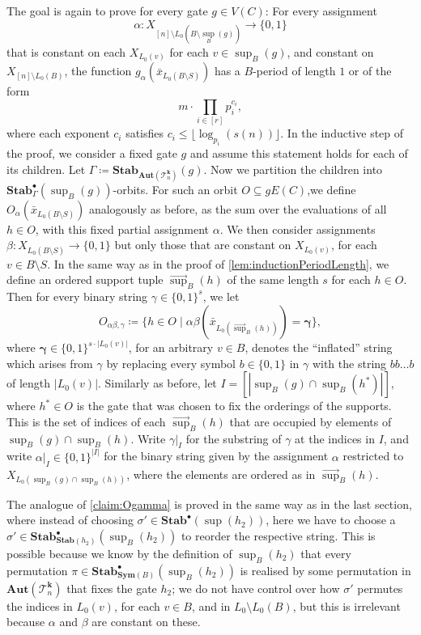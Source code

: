\documentclass[11pt]{article}
\DeclareMathOperator{\supp}{sup}
\newcommand{\Aut}{\mathbf{Aut}}
\newcommand{\Sym}{\mathbf{Sym}}
\newcommand{\Stab}{\mathbf{Stab}}
\newcommand{\StabP}{\mathbf{Stab}^{\bullet}}
\newcommand{\Tt}{{\mathcal T}}
\theoremstyle{definition}
\theoremstyle{plain}
\theoremstyle{remark}
\theoremstyle{remark}
\begin{document}
The goal is again to prove for every gate $g \in V(C)$: For every assignment 
\[
\alpha \colon X_{[n] \setminus L_0(B \setminus \supp_{B}(g))} \to \{0,1\}
\]
that is constant on each $X_{L_0(v)}$ for each $v \in \supp_{B}(g)$, and constant on $X_{[n] \setminus L_0(B)}$, the function $g_\alpha(\bar{x}_{L_0(B \setminus S)})$ has a $B$-period of length  $1$ or of the form 
\[
m \cdot \prod_{i \in [r]} p_i^{c_i},
\]
where each exponent $c_i$ satisfies $c_i \leq \lfloor \log_{p_i}(s(n)) \rfloor$. In the inductive step of the proof, we consider a fixed gate $g$ and assume this statement holds for each of its children. Let $\Gamma \coloneqq  \Stab_{\Aut(\Tt_n^{\boldsymbol{k}})}(g)$.
Now we partition the children into $\StabP_\Gamma(\supp_{B}(g))$-orbits. For such an orbit $O \subseteq gE(C)$,we define $O_\alpha(\bar{x}_{L_0(B \setminus S)})$ analogously as before, as the sum over the evaluations of all $h \in O$, with this fixed partial assignment $\alpha$. 
We then consider assignments $\beta \colon X_{L_0(B \setminus S)} \to \{0,1\}$ but only those that are constant on $X_{L_0(v)}$, for each $v \in B \setminus S$. In the same way as in the proof of \cref{lem:inductionPeriodLength}, we define an ordered support tuple $\vec{\supp}_{B}(h)$ of the same length $s$ for each $h \in O$. Then for every binary string $\gamma \in \{0,1\}^s$, we let
\[
O_{\alpha\beta,\gamma} \coloneqq \{h \in O \mid \alpha\beta(\bar{x}_{L_0(\vec{\supp}_{B}(h))}) = \boldsymbol{\gamma}\},
\]
where $\boldsymbol{\gamma} \in \{0,1\}^{s \cdot |L_0(v)|}$, for an arbitrary $v \in B$, denotes the ``inflated'' string which arises from $\gamma$ by replacing every symbol $b \in \{0,1\}$ in $\gamma$ with the string $bb \dots b$ of length $|L_0(v)|$.
Similarly as before, let $I = [|\supp_{B}(g) \cap \supp_{B}(h^*)|]$, where $h^* \in O$ is the gate that was chosen to fix the orderings of the supports. This is the set of indices of each $\vec{\supp}_{B}(h)$ that are occupied by elements of $\supp_{B}(g) \cap \supp_{B}(h)$. Write $\gamma|_I$ for the substring of $\gamma$ at the indices in $I$, and write $\alpha|_I \in \{0,1\}^{|I|}$ for the binary string given by the assignment $\alpha$ restricted to $X_{L_0(\supp_{B}(g) \cap \supp_{B}(h))}$, where the elements are ordered as in $\vec{\supp}_{B}(h)$.

The analogue of \cref{claim:Ogamma} is proved in the same way as in the last section, where instead of choosing $\sigma' \in \StabP(\supp(h_2))$, here we have to choose a $\sigma' \in \StabP_{\Stab(h_2)}(\supp_{B}(h_2))$ to reorder the respective string. This is possible because we know by the definition of $\supp_{B}(h_2)$ that every permutation $\pi \in \StabP_{\Sym(B)}(\supp_{B}(h_2))$ is realised by some permutation in $\Aut(\Tt_n^{\boldsymbol{k}})$ that fixes the gate $h_2$; we do not have control over how $\sigma'$ permutes the indices in $L_0(v)$, for each $v \in B$, and in $L_0 \setminus L_0(B)$, but this is irrelevant because $\alpha$ and $\beta$ are constant on these.
\end{document}
